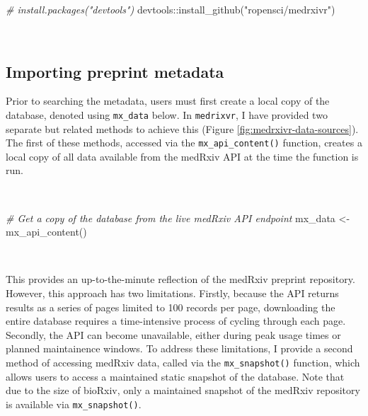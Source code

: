 \documentclass[a4paper, twoside]{templates/ociamthesis}
\newenvironment{Shaded}{\begin{snugshade}}{\end{snugshade}}
\newcommand{\CommentTok}[1]{\textcolor[rgb]{0.56,0.35,0.01}{\textit{#1}}}
\newcommand{\FunctionTok}[1]{\textcolor[rgb]{0.00,0.00,0.00}{#1}}
\newcommand{\NormalTok}[1]{#1}
\newcommand{\OtherTok}[1]{\textcolor[rgb]{0.56,0.35,0.01}{#1}}
\newcommand{\SpecialCharTok}[1]{\textcolor[rgb]{0.00,0.00,0.00}{#1}}
\newcommand{\StringTok}[1]{\textcolor[rgb]{0.31,0.60,0.02}{#1}}
\renewenvironment{Shaded}
{
  \vspace{4pt}%
  \begin{snugshade}%
}{%
  \end{snugshade}%
  \vspace{4pt}%
}
\begin{document}
\begin{Shaded}
\begin{Highlighting}[]
\CommentTok{\# install.packages("devtools") }
\NormalTok{devtools}\SpecialCharTok{::}\FunctionTok{install\_github}\NormalTok{(}\StringTok{"ropensci/medrxivr"}\NormalTok{)}
\end{Highlighting}
\end{Shaded}

~

\hypertarget{importing-preprint-metadata}{%
\subsection{Importing preprint metadata}\label{importing-preprint-metadata}}

Prior to searching the metadata, users must first create a local copy of the database, denoted using \texttt{mx\_data} below. In \texttt{medrixvr}, I have provided two separate but related methods to achieve this (Figure \ref{fig:medrxivr-data-sources}). The first of these methods, accessed via the \texttt{mx\_api\_content()} function, creates a local copy of all data available from the medRxiv API at the time the function is run.

~

\begin{Shaded}
\begin{Highlighting}[]
\CommentTok{\# Get a copy of the database from the live medRxiv API endpoint}
\NormalTok{mx\_data }\OtherTok{\textless{}{-}} \FunctionTok{mx\_api\_content}\NormalTok{()}
\end{Highlighting}
\end{Shaded}

~

This provides an up-to-the-minute reflection of the medRxiv preprint repository. However, this approach has two limitations. Firstly, because the API returns results as a series of pages limited to 100 records per page, downloading the entire database requires a time-intensive process of cycling through each page. Secondly, the API can become unavailable, either during peak usage times or planned maintainence windows. To address these limitations, I provide a second method of accessing medRxiv data, called via the \texttt{mx\_snapshot()} function, which allows users to access a maintained static snapshot of the database. Note that due to the size of bioRxiv, only a maintained snapshot of the medRxiv repository is available via \texttt{mx\_snapshot()}.
\end{document}
